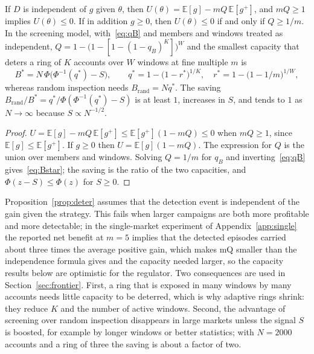 \begin{proposition}[deterrence]\label{prop:deter}
If $D$ is independent of $g$ given $\theta$, then $U(\theta)=\mathbb E[g]-mQ\,\mathbb E[g^+]$, and $mQ\ge1$ implies $U(\theta)\le0$. If in addition $g\ge0$, then $U(\theta)\le0$ if and only if $Q\ge1/m$. In the screening model, with~\eqref{eq:qB} and members and windows treated as independent, $Q=1-\bigl(1-[1-(1-q_B)^K]\bigr)^W$ and the smallest capacity that deters a ring of $K$ accounts over $W$ windows at fine multiple $m$ is
\begin{equation}
B^\ast=N\,\Phi\!\bigl(\Phi^{-1}(q^\ast)-S\bigr),\qquad q^\ast=1-\bigl(1-r^\ast\bigr)^{1/K},\quad r^\ast=1-\bigl(1-1/m\bigr)^{1/W},
\label{eq:Bstar}
\end{equation}
whereas random inspection needs $B_{\mathrm{rand}}=Nq^\ast$. The saving $B_{\mathrm{rand}}/B^\ast=q^\ast/\Phi(\Phi^{-1}(q^\ast)-S)$ is at least $1$, increases in $S$, and tends to $1$ as $N\to\infty$ because $S\propto N^{-1/2}$.
\end{proposition}
\begin{proof}
$U=\mathbb E[g]-mQ\,\mathbb E[g^+]\le\mathbb E[g^+](1-mQ)\le0$ when $mQ\ge1$, since $\mathbb E[g]\le\mathbb E[g^+]$. If $g\ge0$ then $U=\mathbb E[g](1-mQ)$. The expression for $Q$ is the union over members and windows. Solving $Q=1/m$ for $q_B$ and inverting~\eqref{eq:qB} gives~\eqref{eq:Bstar}; the saving is the ratio of the two capacities, and $\Phi(z-S)\le\Phi(z)$ for $S\ge0$. \qedhere
\end{proof}

Proposition~\ref{prop:deter} assumes that the detection event is independent of the gain given the strategy. This fails when larger campaigns are both more profitable and more detectable; in the single-market experiment of Appendix~\ref{app:single} the reported net benefit at $m=5$ implies that the detected episodes carried about three times the average positive gain, which makes mQ smaller than the independence formula gives and the capacity needed larger, so the capacity results below are optimistic for the regulator. Two consequences are used in Section~\ref{sec:frontier}. First, a ring that is exposed in many windows by many accounts needs little capacity to be deterred, which is why adaptive rings shrink: they reduce $K$ and the number of active windows. Second, the advantage of screening over random inspection disappears in large markets unless the signal $S$ is boosted, for example by longer windows or better statistics; with $N=2000$ accounts and a ring of three the saving is about a factor of two.

